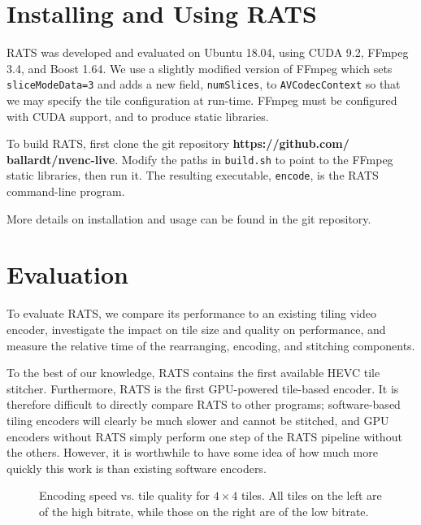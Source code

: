 \section{Installing and Using RATS}
RATS was developed and evaluated on Ubuntu 18.04, using CUDA 9.2, FFmpeg 3.4, and Boost 1.64. We use a slightly modified version of FFmpeg which sets \texttt{sliceModeData=3} and adds a new field, \texttt{numSlices}, to \texttt{AVCodecContext} so that we may specify the tile configuration at run-time. FFmpeg must be configured with CUDA support, and to produce static libraries.

To build RATS, first clone the git repository \textbf{https://github.com/\\ballardt/nvenc-live}. Modify the paths in \texttt{build.sh} to point to the FFmpeg static libraries, then run it. The resulting executable, \texttt{encode}, is the RATS command-line program.

More details on installation and usage can be found in the git repository.

\section{Evaluation}
To evaluate RATS, we compare its performance to an existing tiling video encoder, investigate the impact on tile size and quality on performance, and measure the relative time of the rearranging, encoding, and stitching components.

To the best of our knowledge, RATS contains the first available HEVC tile stitcher. Furthermore, RATS is the first GPU-powered tile-based encoder. It is therefore difficult to directly compare RATS to other programs; software-based tiling encoders will clearly be much slower and cannot be stitched, and GPU encoders without RATS simply perform one step of the RATS pipeline without the others. However, it is worthwhile to have some idea of how much more quickly this work is than existing software encoders. 

\begin{figure}[t]
	\caption{Encoding speed vs. tile quality for $4\times4$ tiles. All tiles on the left are of the high bitrate, while those on the right are of the low bitrate.}
\end{figure}


